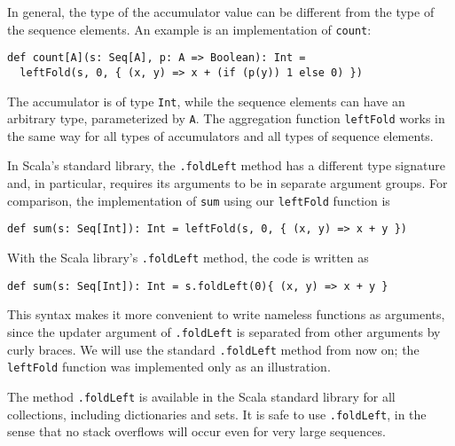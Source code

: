 In general, the type of the accumulator value can be different from
the type of the sequence elements. An example is an implementation
of \lstinline!count!:
\begin{lstlisting}
def count[A](s: Seq[A], p: A => Boolean): Int =
  leftFold(s, 0, { (x, y) => x + (if (p(y)) 1 else 0) })
\end{lstlisting}
The accumulator is of type \lstinline!Int!,
while the sequence elements can have an arbitrary type, parameterized
by \lstinline!A!. The aggregation
function \lstinline!leftFold!
works in the same way for all types of accumulators and all types
of sequence elements.

In Scala's standard library, the \lstinline!.foldLeft!
method has a different type signature and, in particular, requires
its arguments to be in separate argument groups. For comparison, the
implementation of \lstinline!sum!
using our \lstinline!leftFold!
function is
\begin{lstlisting}
def sum(s: Seq[Int]): Int = leftFold(s, 0, { (x, y) => x + y })
\end{lstlisting}
With the Scala library's \lstinline!.foldLeft!
method, the code is written as
\begin{lstlisting}
def sum(s: Seq[Int]): Int = s.foldLeft(0){ (x, y) => x + y }
\end{lstlisting}
This syntax makes it more convenient to write nameless functions as
arguments, since the updater argument of \lstinline!.foldLeft!
is separated from other arguments by curly braces. We will use the
standard \lstinline!.foldLeft!
method from now on; the \lstinline!leftFold!
function was implemented only as an illustration.

The method \lstinline!.foldLeft!
is available in the Scala standard library for all collections, including
dictionaries and sets. It is safe to use \lstinline!.foldLeft!,
in the sense that no stack overflows will occur even for very large
sequences.

